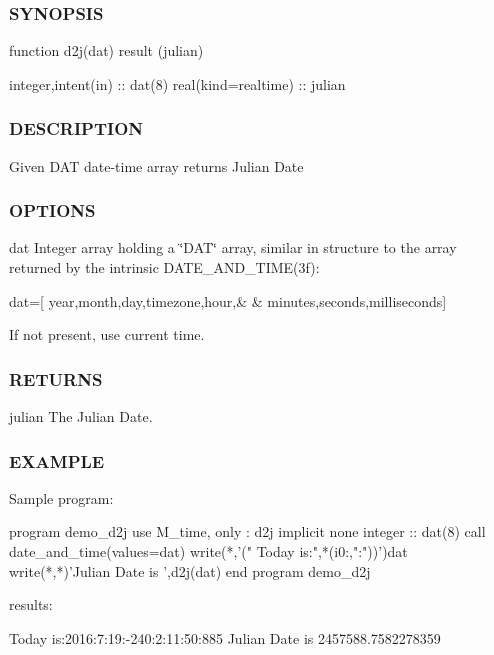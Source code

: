 \subsubsection*{S\+Y\+N\+O\+P\+S\+IS}

\begin{DoxyVerb}function d2j(dat) result (julian)

 integer,intent(in)  :: dat(8)
 real(kind=realtime) :: julian
\end{DoxyVerb}


\subsubsection*{D\+E\+S\+C\+R\+I\+P\+T\+I\+ON}

Given D\+AT date-\/time array returns Julian Date

\subsubsection*{O\+P\+T\+I\+O\+NS}

dat Integer array holding a \char`\"{}\+D\+A\+T\char`\"{} array, similar in structure to the array returned by the intrinsic D\+A\+T\+E\+\_\+\+A\+N\+D\+\_\+\+T\+I\+M\+E(3f)\+:

dat=\mbox{[} year,month,day,timezone,hour,\& \& minutes,seconds,milliseconds\mbox{]}

If not present, use current time. \subsubsection*{R\+E\+T\+U\+R\+NS}

julian The Julian Date.

\subsubsection*{E\+X\+A\+M\+P\+LE}

\begin{DoxyVerb}Sample program:

 program demo_d2j
 use M_time, only : d2j
 implicit none
 integer :: dat(8)
    call date_and_time(values=dat)
    write(*,'(" Today is:",*(i0:,":"))')dat
    write(*,*)'Julian Date is ',d2j(dat)
 end program demo_d2j

results:

 Today is:2016:7:19:-240:2:11:50:885
 Julian Date is    2457588.7582278359
\end{DoxyVerb}


